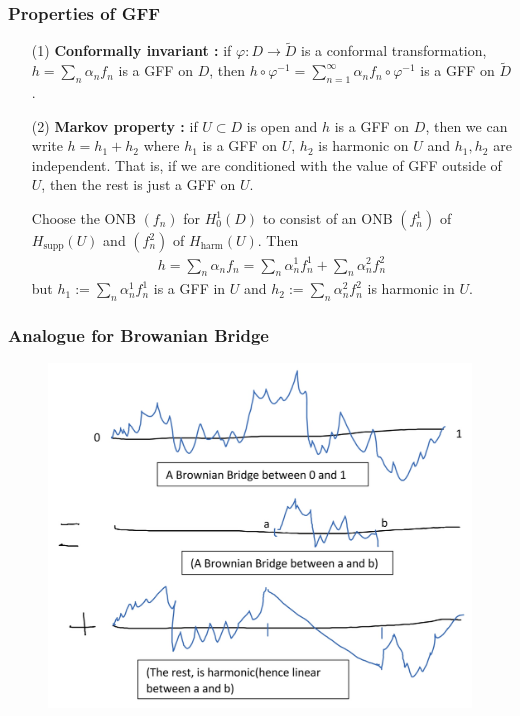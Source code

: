 \documentclass[12pt,a4paper]{article}
\newenvironment{proof}
{\begin{changemargin}{0.5cm}{0.5cm} 
	}%
	{\end{changemargin}
}
\newenvironment{p}
{\begin{proof} 
	}%
	{\end{proof}
}
\begin{document}
\subsubsection*{Properties of GFF}

\begin{itemize}
\item[(1)] \textbf{Conformally invariant :} if $\varphi : D \rightarrow \tilde{D}$ is a conformal transformation, $h = \sum_{n} \alpha_n f_n$ is a GFF on $D$, then $h\circ \varphi^{-1} = \sum_{n=1}^{\infty} \alpha_n f_n \circ \varphi^{-1}$ is a GFF on $\tilde{D}$.

\item[(2)] \textbf{Markov property :} if $U\subset D$ is open and $h$ is a GFF on $D$, then we can write $h= h_1 + h_2$ where $h_1$ is a GFF on $U$, $h_2$ is harmonic on $U$ and $h_1, h_2$ are independent. That is, if we are conditioned with the value of GFF outside of $U$, then the rest is just a GFF on $U$.
\begin{p}
\pf Choose the ONB $(f_n)$ for $H_0^1(D)$ to consist of an ONB $(f_n^1)$ of $H_{\text{supp}}(U)$ and $(f_n^2)$ of $H_{\text{harm}}(U)$. Then
\begin{align*}
h = \sum_{n} \alpha_n f_n = \sum_{n} \alpha_n^1 f_n^1 + \sum_n \alpha_n^2 f_n^2
\end{align*}
but $h_1 := \sum_{n} \alpha_n^1 f_n^1$ is a GFF in $U$ and $h_2 := \sum_{n} \alpha_n^2 f_n^2$ is harmonic in $U$.

\eop
\end{p}  
\end{itemize}

\subsubsection*{Analogue for Browanian Bridge}
\vspace{-10pt}

\begin{figure}[h]
    \begin{center}
    \includegraphics[scale=0.18]{8}
    \end{center}
\end{figure}
\s
\end{document}
